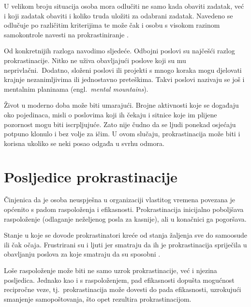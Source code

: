 \documentclass[11pt,english]{article}
\newcommand{\engl}[1]{(engl.~\emph{#1})}
\begin{document}
\begin{multicols}{2}
U velikom broju situacija osoba mora odlučiti ne samo kada obaviti zadatak, već
i koji zadatak obaviti i koliko truda uložiti za odabrani zadatak. 
Navedeno se odlučuje po različitim kriterijima te može čak i osobu s visokom
razinom samokontrole navesti na prokrastiniranje \cite{o2001choice}.

Od konkretnijih razloga \cite{PickBrain5reasons, Lifehack6reasons} navodimo
sljedeće. Odbojni poslovi su najčešći razlog prokrastinacije. Nitko ne uživa
obavljajući poslove koji su mu neprivlačni.~Dodatno, složeni poslovi ili
projekti s mnogo koraka mogu djelovati krajnje nezanimljivima ili jednostavno
preteškima. Takvi poslovi nazivaju se još i mentalnim planinama \engl{mental
mountains}.

Život u moderno doba može biti umarajući. Brojne aktivnosti koje se
događaju oko pojedinaca, misli o poslovima koji ih čekaju i sitnice koje im
plijene pozornost mogu biti iscrpljujuće. Zato nije čudno da se ljudi ponekad
osjećaju potpuno klonulo i bez volje za ičim. U ovom slučaju,
prokrastinacija može biti i korisna ukoliko se neki posao odgađa u svrhu odmora.


\section{Posljedice prokrastinacije}
Činjenica da je osoba neuspješna u organizaciji vlastitog vremena povezana je
općenito s padom raspoloženja i efikasnosti. Prokrastinacija inicijalno
poboljšava raspoloženje (odlaganje neželjenog posla za kasnije), ali u
konačnici ga pogoršava.

Stanje u koje se dovode prokrastinatori kreće od
stanja žaljenja sve do samoosude ili čak očaja. Frustrirani su i ljuti jer
smatraju da ih je prokrastinacija spriječila u obavljanju poslova za koje
smatraju da su sposobni \cite{burka2004procrastination}.

Loše raspoloženje može biti ne samo uzrok prokrastinacije,
već i njezina posljedica. Jednako kao i s raspoloženjem, pad efikasnosti
dopušta mogućnost recipročne veze, tj.~prokrastinacija može dovesti do pada
efikasnosti, uzrokujući smanjenje samopoštovanja, što opet rezultira prokrastinacijom.



\end{multicols}
\end{document}
